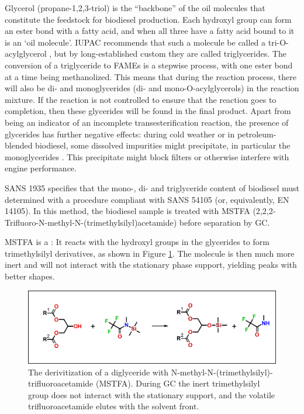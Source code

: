 Glycerol (propane-1,2,3-triol) is the ``backbone'' of the oil molecules that
constitute the feedstock for biodiesel production. Each hydroxyl group can form
an ester bond with a fatty acid, and when all three have a fatty acid bound to
it is an `oil molecule'. IUPAC recommends that such a molecule be called a
tri-O-acylglycerol \autocite{Nic2009}, but by long-established custom they are
called triglycerides. The conversion of a triglyceride to FAMEs is a stepwise
process, with one ester bond at a time being methanolized. This means that
during the reaction process, there will also be di- and monoglycerides (di- and
mono-O-acylglycerols) in the reaction mixture. If the reaction is not controlled
to ensure that the reaction goes to completion, then these glycerides will be
found in the final product. Apart from being an indicator of an incomplete
transesterification reaction, the presence of glycerides has further negative
effects: during cold weather or in petroleum-blended biodiesel, some dissolved
impurities might precipitate, in particular the monoglycerides
\autocite{Dunn2009,Plata2015}. This precipitate might block filters or otherwise
interfere with engine performance.

SANS 1935 specifies that the mono-, di- and triglyceride content of biodiesel
must determined with a procedure compliant with SANS 54105 (or, equivalently, EN
14105). In this method, the biodiesel sample is treated with MSTFA
(2,2,2-Trifluoro-N-methyl-N-(trimethylsilyl)acetamide) before separation by GC.

MSTFA is a : It reacts with the hydroxyl groups
in the glycerides to form trimethylsilyl derivatives, as shown in Figure
\ref{fig:MSTFA}. The molecule is then much more inert and will not interact with
the stationary phase support, yielding peaks with better shapes.

\begin{figure}
\centering
\includegraphics[width=\textwidth]{Figures/Derivatization.pdf}
\decoRule

\caption[Derivitization]{The derivitization of a diglyceride with
N-methyl-N-(trimethylsilyl)-trifluoroacetamide (MSTFA). During GC the inert
trimethylsilyl group does not interact with the stationary support,
and the volatile trifluoroacetamide elutes with the solvent front.}

\label{fig:MSTFA}
\end{figure}

